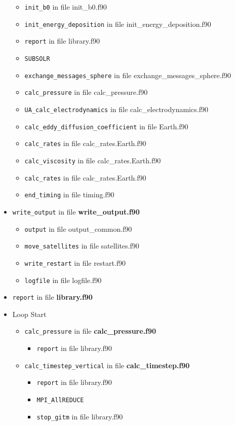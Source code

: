 \begin{itemize}
\begin{itemize}
    \item {\tt init\_b0} in file init\_b0.f90
    \item {\tt init\_energy\_deposition} in file init\_energy\_deposition.f90
    \item {\tt report} in file library.f90
    \item {\tt SUBSOLR}
    \item {\tt exchange\_messages\_sphere} in file exchange\_messages\_sphere.f90
    \item {\tt calc\_pressure} in file calc\_pressure.f90
    \item {\tt UA\_calc\_electrodynamics} in file calc\_electrodynamics.f90
    \item {\tt calc\_eddy\_diffusion\_coefficient} in file Earth.f90
    \item {\tt calc\_rates} in file calc\_rates.Earth.f90
    \item {\tt calc\_viscosity} in file calc\_rates.Earth.f90
    \item {\tt calc\_rates} in file calc\_rates.Earth.f90
    \item {\tt end\_timing} in file timing.f90
  \end{itemize}


\item {\tt write\_output}   in file {\bf write\_output.f90}
  \begin{itemize}
    \item {\tt output} in file output\_common.f90
    \item {\tt move\_satellites} in file satellites.f90
    \item {\tt write\_restart} in file restart.f90
    \item {\tt logfile} in file logfile.f90
  \end{itemize}


\item {\tt report}   in file {\bf library.f90}


\item Loop Start
  \begin{itemize}


  \item {\tt calc\_pressure}   in file {\bf calc\_pressure.f90}
    \begin{itemize}
      \item {\tt report} in file library.f90
    \end{itemize}


  \item {\tt calc\_timestep\_vertical}   in file {\bf calc\_timestep.f90}
    \begin{itemize}
      \item {\tt report} in file library.f90
      \item {\tt MPI\_AllREDUCE}
      \item {\tt stop\_gitm} in file library.f90
    \end{itemize}



\end{itemize}
\end{itemize}
